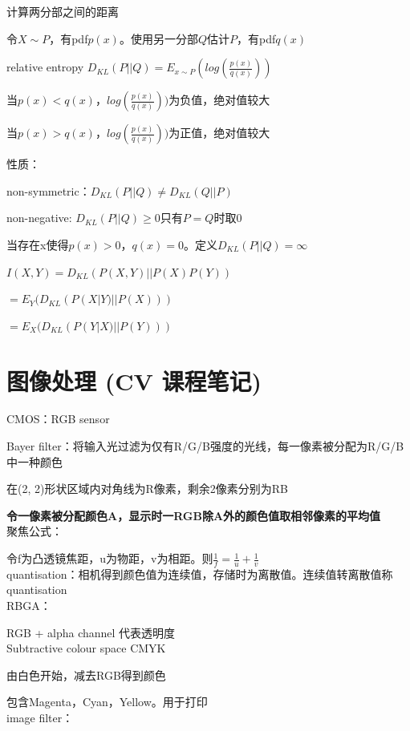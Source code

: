\documentclass[UTF8]{ctexart}
\begin{document}
  计算两分部之间的距离

  令$X \sim P$，有pdf$p(x)$。使用另一分部$Q$估计$P$，有pdf$q(x)$

  relative entropy $D_{KL}(P || Q) = E_{x \sim P}(log(\frac{p(x)}{q(x)}))$

  \quad 当$p(x) < q(x)$，$log(\frac{p(x)}{q(x)}))$为负值，绝对值较大
  
  \quad 当$p(x) > q(x)$，$log(\frac{p(x)}{q(x)}))$为正值，绝对值较大

  性质：

  \quad non-symmetric：$D_{KL}(P||Q) \neq D_{KL}(Q || P)$

  \quad non-negative: $D_{KL}(P||Q) \geq 0$只有$P = Q$时取0

  \quad 当存在x使得$p(x) > 0$，$q(x) = 0$。定义$D_{KL}(P||Q) = \infty$

  \quad $I(X, Y) = D_{KL}(P(X, Y) || P(X)P(Y))$

  \quad \quad $ = E_Y(D_{KL}(P(X | Y) || P(X)))$

  \quad \quad $ = E_X(D_{KL}(P(Y | X) || P(Y)))$

\section{图像处理 (CV 课程笔记)}
\noindent CMOS：RGB sensor

  Bayer filter：将输入光过滤为仅有R/G/B强度的光线，每一像素被分配为R/G/B中一种颜色

  \quad 在(2, 2)形状区域内对角线为R像素，剩余2像素分别为RB

  \textbf{令一像素被分配颜色A，显示时一RGB除A外的颜色值取相邻像素的平均值}\\
聚焦公式：

  令f为凸透镜焦距，u为物距，v为相距。则$\frac{1}{f} = \frac{1}{u} + \frac{1}{v}$\\
quantisation：相机得到颜色值为连续值，存储时为离散值。连续值转离散值称quantisation\\
RBGA：

  RGB + alpha channel 代表透明度\\
Subtractive colour space CMYK

  由白色开始，减去RGB得到颜色

  包含Magenta，Cyan，Yellow。用于打印\\
image filter：
\end{document}
